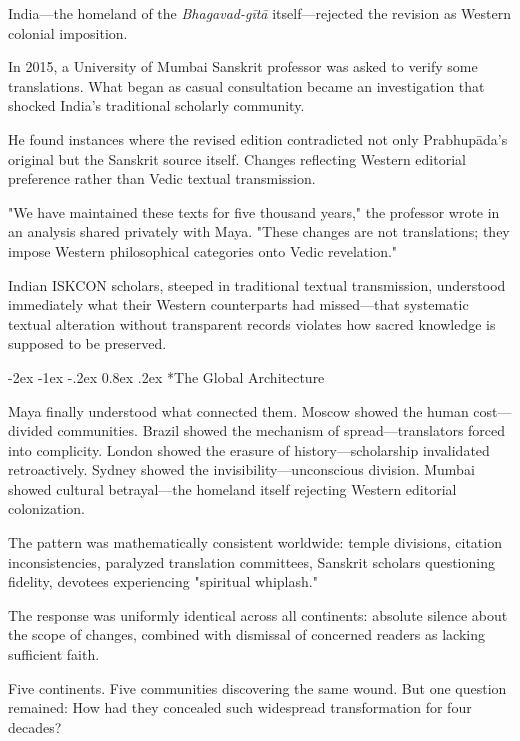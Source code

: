 \documentclass[12pt,twoside]{book}
\makeatletter
\let\oldsubsection\subsection
\renewcommand{\subsection}[1]{\needspace{3\baselineskip}\oldsubsection{#1}}
\renewcommand\subsection{\@startsection{subsection}{2}{\z@}%
{-2ex \@plus -1ex \@minus -.2ex}%
{0.8ex \@plus .2ex}%
{\normalfont\large\bfseries}}
\makeatother
\begin{document}
India—the homeland of the \emph{Bhagavad-gītā} itself—rejected the revision as Western colonial imposition.

In 2015, a University of Mumbai Sanskrit professor was asked to verify some translations. What began as casual consultation became an investigation that shocked India's traditional scholarly community.

He found instances where the revised edition contradicted not only Prabhupāda's original but the Sanskrit source itself. Changes reflecting Western editorial preference rather than Vedic textual transmission.

"We have maintained these texts for five thousand years," the professor wrote in an analysis shared privately with Maya. "These changes are not translations; they impose Western philosophical categories onto Vedic revelation."

Indian ISKCON scholars, steeped in traditional textual transmission, understood immediately what their Western counterparts had missed—that systematic textual alteration without transparent records violates how sacred knowledge is supposed to be preserved.

\vspace{0.1cm}
\subsection*{The Global Architecture}

Maya finally understood what connected them. Moscow showed the human cost—divided communities. Brazil showed the mechanism of spread—translators forced into complicity. London showed the erasure of history—scholarship invalidated retroactively. Sydney showed the invisibility—unconscious division. Mumbai showed cultural betrayal—the homeland itself rejecting Western editorial colonization.

The pattern was mathematically consistent worldwide: temple divisions, citation inconsistencies, paralyzed translation committees, Sanskrit scholars questioning fidelity, devotees experiencing "spiritual whiplash."

The response was uniformly identical across all continents: absolute silence about the scope of changes, combined with dismissal of concerned readers as lacking sufficient faith.

Five continents. Five communities discovering the same wound. But one question remained: How had they concealed such widespread transformation for four decades?
\end{document}
